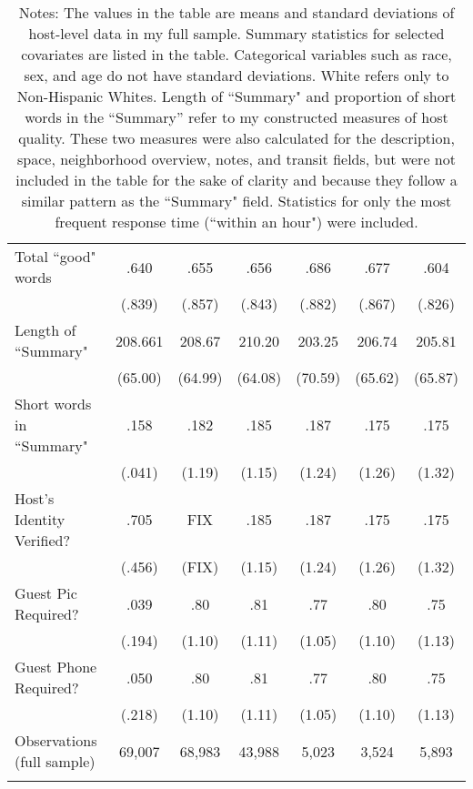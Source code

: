 {\begin{longtable}{l*{6}{c}}
		Total ``good" words       & .640   &      .655&      .656&       .686         &      .677    &	.604     \\
		& (.839) &     (.857)         &     (.843)         &     (.882)         &     (.867)         &		(.826)\\

		Length of ``Summary"      &   208.661  &      208.67 	&      210.20	&       203.25         &      206.74    &	205.81     \\
		&(65.00) &       (64.99)  &    (64.08)         &     (70.59)         &     (65.62)         &     (65.87) \\

		Short words in ``Summary"          & .158 &      .182		&      .185		&       .187         &      .175    &	.175     \\
		&(.041) &     (1.19)         &     (1.15)         &     (1.24)         &     (1.26)         &		(1.32)\\                    

		Host's Identity Verified?          & .705 &      FIX		&      .185		&       .187         &      .175    &	.175     \\
		&(.456) &     (FIX)         &     (1.15)         &     (1.24)         &     (1.26)         &		(1.32)\\                    

		Guest Pic Required?   &   .039  &      .80		&      .81&      .77 &      .80  	& 	.75\\
		&  (.194)  & (1.10)     &     (1.11)         &     (1.05)         &     (1.10)         &     (1.13)         \\
		Guest Phone Required?   &   .050  &      .80		&      .81&      .77 &      .80  	& 	.75\\
		&  (.218)  & (1.10)     &     (1.11)         &     (1.05)         &     (1.10)         &     (1.13)         \\
		
		
		\hline
		Observations (full sample)    & 69,007  & 68,983   &       43,988         &       5,023         &       3,524         &       5,893         \\
		\hline\hline
		\caption*{Notes: The values in the table are means and standard deviations of host-level data in my full sample. Summary statistics for selected covariates are listed in the table. Categorical variables such as race, sex, and age do not have standard deviations. White refers only to Non-Hispanic Whites. Length of ``Summary" and proportion of short words in the ``Summary'' refer to my constructed measures of host quality. These two measures were also calculated for the description, space, neighborhood overview, notes, and transit fields, but were not included in the table for the sake of clarity and because they follow a similar pattern as the ``Summary" field. Statistics for only the most frequent response time (``within an hour") were included.}
		
	\end{longtable}
}
